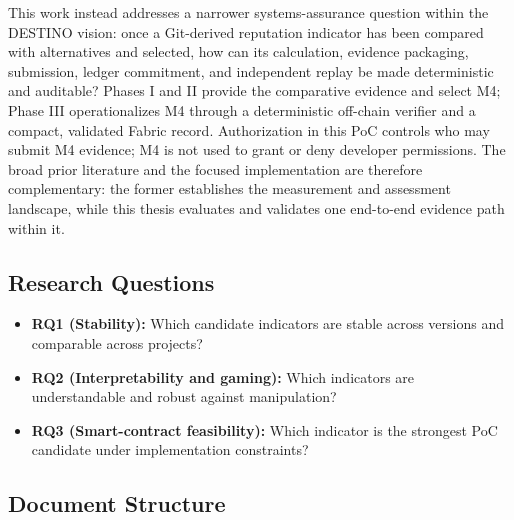 This work instead addresses a narrower systems-assurance question within the DESTINO vision: once a Git-derived reputation
indicator has been compared with alternatives and selected, how can its calculation, evidence packaging, submission,
ledger commitment, and independent replay be made deterministic and auditable? Phases I and II provide the comparative
evidence and select M4; Phase III operationalizes M4 through a deterministic off-chain verifier and a compact, validated
Fabric record. Authorization in this PoC controls who may submit M4 evidence; M4 is not used to grant or deny developer
permissions. The broad prior literature and the focused implementation are therefore complementary: the former establishes
the measurement and assessment landscape, while this thesis evaluates and validates one end-to-end evidence path within it.

\subsection*{Research Questions}

\begin{itemize}[leftmargin=*]
  \item \textbf{RQ1 (Stability):} Which candidate indicators are stable across versions and comparable across projects?
  \item \textbf{RQ2 (Interpretability and gaming):} Which indicators are understandable and robust against manipulation?
  \item \textbf{RQ3 (Smart-contract feasibility):} Which indicator is the strongest PoC candidate under implementation constraints?
\end{itemize}

\subsection*{Document Structure}

